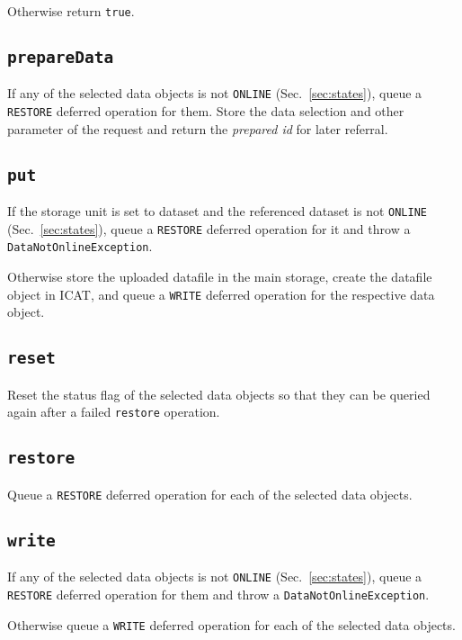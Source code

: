 \documentclass[paper=a4]{scrartcl}
\begin{document}
Otherwise return \texttt{true}.

\subsection{\texttt{prepareData}}
\label{sec:requests:prepareData}

If any of the selected data objects is not \texttt{ONLINE}
(Sec.~\ref{sec:states}), queue a \texttt{RESTORE} deferred operation
for them.  Store the data selection and other parameter of the request
and return the \emph{prepared id} for later referral.

\subsection{\texttt{put}}
\label{sec:requests:put}

If the storage unit is set to dataset and the referenced dataset is
not \texttt{ONLINE} (Sec.~\ref{sec:states}), queue a \texttt{RESTORE}
deferred operation for it and throw a \texttt{DataNotOnlineException}.

Otherwise store the uploaded datafile in the main storage, create the
datafile object in ICAT, and queue a \texttt{WRITE} deferred operation
for the respective data object.

\subsection{\texttt{reset}}

Reset the status flag of the selected data objects so that they can
be queried again after a failed \texttt{restore} operation.

\subsection{\texttt{restore}}

Queue a \texttt{RESTORE} deferred operation for each of the selected
data objects.

\subsection{\texttt{write}}
\label{sec:requests:write}

If any of the selected data objects is not \texttt{ONLINE}
(Sec.~\ref{sec:states}), queue a \texttt{RESTORE} deferred operation
for them and throw a \texttt{DataNotOnlineException}.

Otherwise queue a \texttt{WRITE} deferred operation for each of the
selected data objects.
\end{document}

